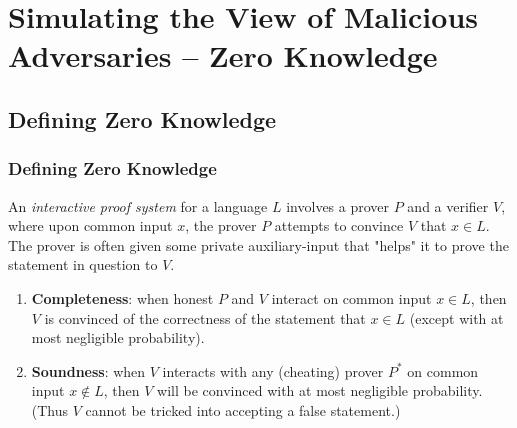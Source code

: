 \documentclass{beamer}
\begin{document}
        
    \section{Simulating the View of Malicious Adversaries – Zero Knowledge}
  
    \subsection{Defining Zero Knowledge}

    \sectionpage

    \begin{frame}
        \frametitle{Defining Zero Knowledge}
        \begin{definition}[IP]
            An \emph{interactive proof system} for a language $L$ involves a prover $P$ and a verifier $V$, where upon common input $x$, the prover $P$ attempts to convince $V$ that $x \in L$. The prover is often given some private auxiliary-input that "helps" it to prove the statement in question to $V$. 
            \begin{enumerate}
                \item  \textbf{Completeness}:  when honest $P$ and $V$ interact on common input $x \in L$, then $V$ is convinced of the correctness of the statement that $x \in L$ (except with at most negligible probability).
                \item \textbf{Soundness}:  when $V$ interacts with any (cheating) prover $P^{*}$ on common input $x \notin L$, then $V$ will be convinced with at most negligible probability. (Thus $V$ cannot be tricked into accepting a false statement.)
            \end{enumerate}
        \end{definition}
    
        
    
    \end{frame}
\end{document}

